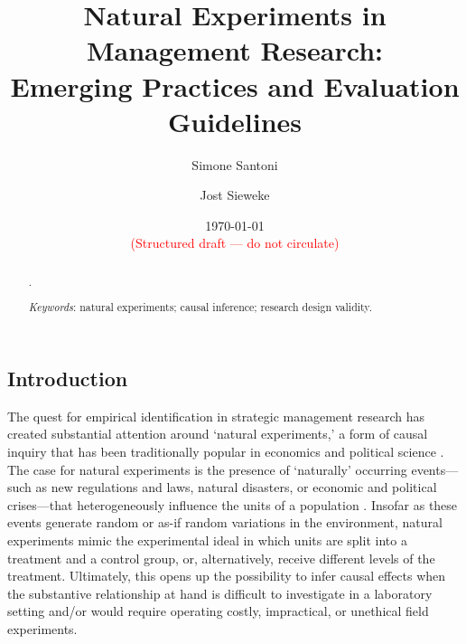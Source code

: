 \documentclass[nobib]{tufte-handout}
\title[Natural Experiments in Management Research]
{Natural Experiments in Management Research:\\Emerging Practices and 
Evaluation Guidelines\vspace{2em}}
\author[$\bullet\circ$]{Simone Santoni}
\author[$\star$]{Jost Sieweke}
\affil[$\bullet$]{Bayes Business School (formerly Cass)}
\affil[$\circ$]{Soundcloud}
\affil[$\star$]{Vrije Universiteit Amsterdam}
\date{\vspace{1em} \normalsize \today \vspace{1em} \\ 
      \textcolor{red}{(Structured draft --- do not circulate)}}
\begin{document}
\maketitle

\begin{abstract}
  \noindent
  .

  \bigskip

  \noindent \textit{Keywords}: natural experiments; causal inference; research 
  design validity.

\end{abstract}

\clearpage

\begin{refsection}

\section{Introduction}
\label{introduction}


\noindent The quest for empirical identification in strategic management
research has created substantial attention around `natural experiments,' a form
of causal inquiry that has been traditionally popular in economics
\parencite[][]{Meyer1995,Rosenzweig2000} and political science
\parencite[][]{Dunning2008}.  The case for natural experiments is the presence
of `naturally' occurring events---such as new regulations and laws, natural
disasters, or economic and political crises---that heterogeneously influence
the units of a population \parencite[][]{Dunning2012,Robinson2009}. Insofar as
these events generate random or as-if random variations in the environment,
natural experiments mimic the experimental ideal in which units are split into a
treatment and a control group, or, alternatively, receive different levels of
the treatment. Ultimately, this opens up the possibility to infer causal effects
when the substantive relationship at hand is difficult to investigate in a
laboratory setting and/or would require operating costly, impractical, or
unethical field experiments.



\end{refsection}
\end{document}
